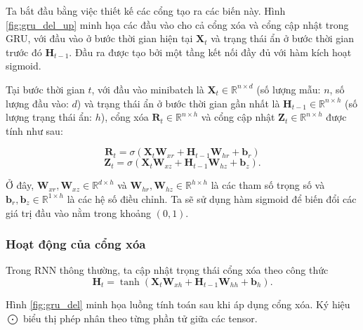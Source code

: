 \documentclass[conference]{IEEEtran}
\begin{document}
Ta bắt đầu bằng việc thiết kế các cổng tạo ra các biến này. Hình \ref{fig:gru_del_up}
minh họa các đầu vào cho cả cổng xóa và cổng cập nhật trong GRU, với đầu vào ở bước thời gian hiện tại  \(\mathbf{X}_t \)
và trạng thái ẩn ở bước thời gian trước đó  \(\mathbf{H}_{t-1} \). Đầu ra được tạo bởi một tầng kết nối đầy đủ với hàm kích hoạt sigmoid.

Tại bước thời gian $t$, với đầu vào minibatch là $\mathbf{X}_t \in \mathbb{R}^{n \times d}$ (số lượng mẫu: $n$, số lượng đầu vào: $d$) và trạng thái ẩn ở bước thời gian gần nhất là $\mathbf{H}_{t-1} \in \mathbb{R}^{n \times h}$ (số lượng trạng thái ẩn: $h$), cổng xóa $\mathbf{R}_t \in \mathbb{R}^{n \times h}$ và cổng cập nhật $\mathbf{Z}_t \in \mathbb{R}^{n \times h}$ được tính như sau:

\begin{equation*}
    \mathbf{R}_t = \sigma(\mathbf{X}_t \mathbf{W}_{xr} + \mathbf{H}_{t-1} \mathbf{W}_{hr} + \mathbf{b}_r)
\end{equation*}
\begin{equation*}
    \mathbf{Z}_t = \sigma(\mathbf{X}_t \mathbf{W}_{xz} + \mathbf{H}_{t-1} \mathbf{W}_{hz} + \mathbf{b}_z).
\end{equation*}

Ở đây, $\mathbf{W}_{xr}, \mathbf{W}_{xz} \in \mathbb{R}^{d \times h}$ và $\mathbf{W}_{hr}, \mathbf{W}_{hz} \in \mathbb{R}^{h \times h}$ là các tham số trọng số và $\mathbf{b}_r, \mathbf{b}_z \in \mathbb{R}^{1 \times h}$ là các hệ số điều chỉnh. Ta sẽ sử dụng hàm sigmoid để biến đổi các giá trị đầu vào nằm trong khoảng $(0, 1)$.

\subsubsection{Hoạt động của cổng xóa}
Trong RNN thông thường, ta cập nhật trọng thái cổng xóa theo công thức
\[
    \mathbf{H}_t = \tanh(\mathbf{X}_t \mathbf{W}_{xh} + \mathbf{H}_{t-1} \mathbf{W}_{hh} + \mathbf{b}_h).
\]

Hình \ref{fig:gru_del} minh họa luồng tính toán sau khi áp dụng cổng xóa. Ký hiệu \(\bigodot\) biểu thị phép nhân theo từng phần tử giữa các tensor.
\end{document}
